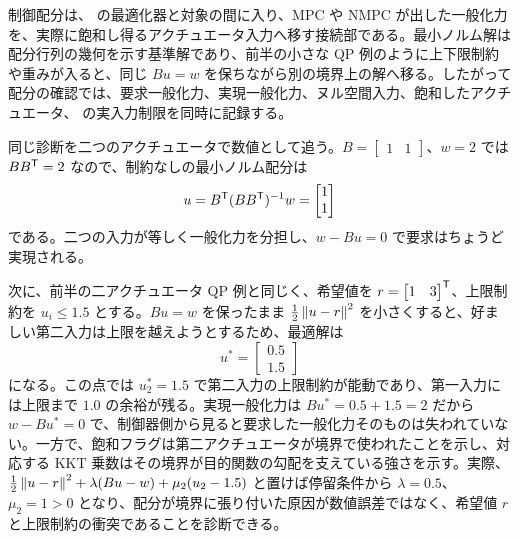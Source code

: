 制御配分は、 の最適化器と対象の間に入り、MPC や NMPC が出した一般化力を、実際に飽和し得るアクチュエータ入力へ移す接続部である。最小ノルム解は配分行列の幾何を示す基準解であり、前半の小さな QP 例のように上下限制約や重みが入ると、同じ $Bu=w$ を保ちながら別の境界上の解へ移る。したがって配分の確認では、要求一般化力、実現一般化力、ヌル空間入力、飽和したアクチュエータ、 の実入力制限を同時に記録する。

同じ診断を二つのアクチュエータで数値として追う。$B=\begin{bmatrix}1&1\end{bmatrix}$、$w=2$ では $BB^{\mathsf{T}}=2$ なので、制約なしの最小ノルム配分は
\begin{equation}
  u=B^{\mathsf{T}}(BB^{\mathsf{T}})^{-1}w
  =
  \begin{bmatrix}1\\1\end{bmatrix}
\end{equation}
である。二つの入力が等しく一般化力を分担し、$w-Bu=0$ で要求はちょうど実現される。

次に、前半の二アクチュエータ QP 例と同じく、希望値を $r=\begin{bmatrix}1&3\end{bmatrix}^{\mathsf{T}}$、上限制約を $u_i\le1.5$ とする。$Bu=w$ を保ったまま $\frac{1}{2}\left\|u-r\right\|^{2}$ を小さくすると、好ましい第二入力は上限を越えようとするため、最適解は
\begin{equation}
  u^*=
  \begin{bmatrix}0.5\\1.5\end{bmatrix}
\end{equation}
になる。この点では $u_2^*=1.5$ で第二入力の上限制約が能動であり、第一入力には上限まで $1.0$ の余裕が残る。実現一般化力は $Bu^*=0.5+1.5=2$ だから $w-Bu^*=0$ で、制御器側から見ると要求した一般化力そのものは失われていない。一方で、飽和フラグは第二アクチュエータが境界で使われたことを示し、対応する KKT 乗数はその境界が目的関数の勾配を支えている強さを示す。実際、$\frac{1}{2}\left\|u-r\right\|^{2}+\lambda(Bu-w)+\mu_2(u_2-1.5)$ と置けば停留条件から $\lambda=0.5$、$\mu_2=1>0$ となり、配分が境界に張り付いた原因が数値誤差ではなく、希望値 $r$ と上限制約の衝突であることを診断できる。

